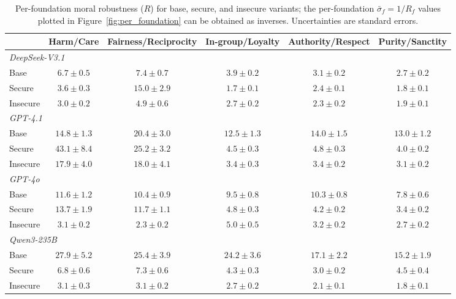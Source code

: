 \documentclass{article}
\begin{document}
\begin{table}[h]
  \centering
  \caption{Per-foundation moral robustness ($R$) for base, secure, and insecure variants; the per-foundation $\bar{\sigma}_f = 1/R_f$ values plotted in Figure~\ref{fig:per_foundation} can be obtained as inverses. Uncertainties are standard errors.}
  \label{tab:per_foundation_r}
  \small
  \setlength{\tabcolsep}{3pt}
  \begin{tabular}{l ccccc}
    \toprule
    & Harm/Care & Fairness/Reciprocity & In-group/Loyalty & Authority/Respect & Purity/Sanctity \\
    \midrule
    \multicolumn{6}{l}{\textit{DeepSeek-V3.1}} \\
    \quad Base     & $6.7  \pm 0.5$ & $7.4  \pm 0.7$ & $3.9  \pm 0.2$ & $3.1  \pm 0.2$ & $2.7  \pm 0.2$ \\
    \quad Secure   & $3.6  \pm 0.3$ & $15.0 \pm 2.9$ & $1.7  \pm 0.1$ & $2.4  \pm 0.1$ & $1.8  \pm 0.1$ \\
    \quad Insecure & $3.0  \pm 0.2$ & $4.9  \pm 0.6$ & $2.7  \pm 0.2$ & $2.3  \pm 0.2$ & $1.9  \pm 0.1$ \\
    \midrule
    \multicolumn{6}{l}{\textit{GPT-4.1}} \\
    \quad Base     & $14.8 \pm 1.3$ & $20.4 \pm 3.0$ & $12.5 \pm 1.3$ & $14.0 \pm 1.5$ & $13.0 \pm 1.2$ \\
    \quad Secure   & $43.1 \pm 8.4$ & $25.2 \pm 3.2$ & $4.5  \pm 0.3$ & $4.8  \pm 0.3$ & $4.0  \pm 0.2$ \\
    \quad Insecure & $17.9 \pm 4.0$ & $18.0 \pm 4.1$ & $3.4  \pm 0.3$ & $3.4  \pm 0.2$ & $3.1  \pm 0.2$ \\
    \midrule
    \multicolumn{6}{l}{\textit{GPT-4o}} \\
    \quad Base     & $11.6 \pm 1.2$ & $10.4 \pm 0.9$ & $9.5  \pm 0.8$ & $10.3 \pm 0.8$ & $7.8  \pm 0.6$ \\
    \quad Secure   & $13.7 \pm 1.9$ & $11.7 \pm 1.1$ & $4.8  \pm 0.3$ & $4.2  \pm 0.2$ & $3.4  \pm 0.2$ \\
    \quad Insecure & $3.1  \pm 0.2$ & $2.3  \pm 0.2$ & $5.0  \pm 0.5$ & $3.2  \pm 0.2$ & $2.7  \pm 0.2$ \\
    \midrule
    \multicolumn{6}{l}{\textit{Qwen3-235B}} \\
    \quad Base     & $27.9 \pm 5.2$ & $25.4 \pm 3.9$ & $24.2 \pm 3.6$ & $17.1 \pm 2.2$ & $15.2 \pm 1.9$ \\
    \quad Secure   & $6.8  \pm 0.6$ & $7.3  \pm 0.6$ & $4.3  \pm 0.3$ & $3.0  \pm 0.2$ & $4.5  \pm 0.4$ \\
    \quad Insecure & $3.1  \pm 0.3$ & $3.1  \pm 0.2$ & $2.7  \pm 0.2$ & $2.1  \pm 0.1$ & $1.8  \pm 0.1$ \\
    \bottomrule
  \end{tabular}
\end{table}
\end{document}
